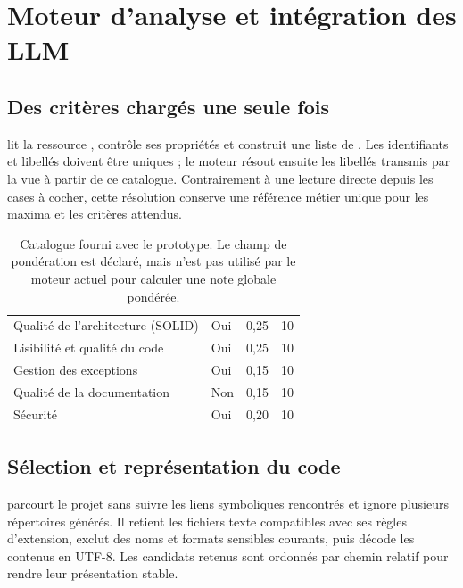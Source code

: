 \section{Moteur d'analyse et intégration des LLM}
\label{sec:ia}
\subsection{Des critères chargés une seule fois}
 lit la ressource , contrôle ses propriétés et construit une liste de . Les identifiants et libellés doivent être uniques ; le moteur résout ensuite les libellés transmis par la vue à partir de ce catalogue. Contrairement à une lecture directe depuis les cases à cocher, cette résolution conserve une référence métier unique pour les maxima et les critères attendus.

\begin{table}[H]
\small
\begin{tabularx}{\textwidth}{@{}YP{24mm}P{21mm}P{21mm}@{}}
\toprule
{} &  &  & \\
\midrule
Qualité de l'architecture (SOLID) & Oui & 0,25 & 10\\
Lisibilité et qualité du code & Oui & 0,25 & 10\\
Gestion des exceptions & Oui & 0,15 & 10\\
Qualité de la documentation & Non & 0,15 & 10\\
Sécurité & Oui & 0,20 & 10\\
\bottomrule
\end{tabularx}
\caption{Catalogue fourni avec le prototype. Le champ de pondération est déclaré, mais n'est pas utilisé par le moteur actuel pour calculer une note globale pondérée.}
\end{table}

\subsection{Sélection et représentation du code}
 parcourt le projet sans suivre les liens symboliques rencontrés et ignore plusieurs répertoires générés. Il retient les fichiers texte compatibles avec ses règles d'extension, exclut des noms et formats sensibles courants, puis décode les contenus en UTF-8. Les candidats retenus sont ordonnés par chemin relatif pour rendre leur présentation stable.

